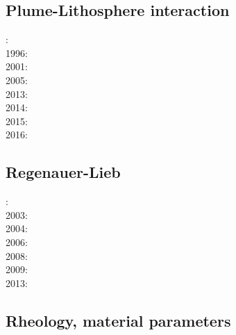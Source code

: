 \subsection*{Plume-Lithosphere interaction}

: \cite{rich94}\\
1996: \cite{zhgm96}\\
2001: \cite{vapy01}\\
2005: \cite{bugu05}\\
2013: \cite{bemm13}\cite{brps13}\\
2014: \cite{buge14}\\
2015: \cite{gesb15}\cite{kocb15}\cite{meds15}\\
2016: \cite{fige16}\cite{gadb16}


\subsection*{Regenauer-Lieb}

: \cite{reyu00}\\
2003: \cite{reyu03}\\
2004: \cite{reyu04}\\
2006: \cite{rehy06}\cite{rewr06}\\
2008: \cite{rerw08}\\
2009: \cite{reps09}\\
2013: \cite{revp13}

\subsection*{Rheology, material parameters}

